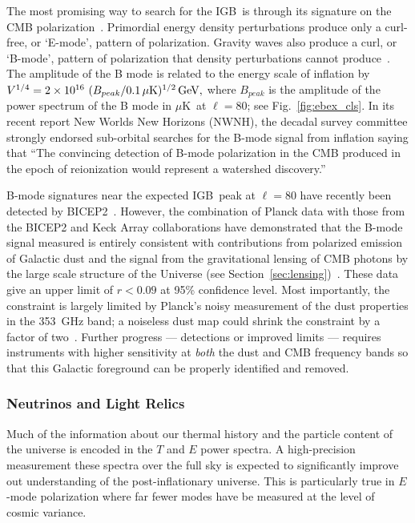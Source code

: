 \documentclass[12pt]{article}
\def\igb{IGB}
\def\microk{$\mu{\mbox{K}}$}
\begin{document}
The most promising way to search for the \igb\ is through its signature on the CMB polarization~\cite{kamionkowski97b,seljak97}.  
Primordial energy density perturbations produce only a curl-free, or `E-mode', pattern of polarization.
Gravity waves also produce a curl, or `B-mode', pattern of polarization that density perturbations cannot
produce~\cite{kamionkowski97a,zaldarriaga97}.  The amplitude of the B mode is related to the energy scale
of inflation by $V^{1/4}=2\times10^{16} \ ( B_{peak} / 0.1\,\mu{\rm
K})^{1/2} \,{\rm GeV},$ where $B_{peak}$ is the amplitude of the power spectrum of the B mode in \microk\ at $\ell=80$;
see Fig.~\ref{fig:ebex_cls}. In its recent report New Worlds New Horizons (NWNH), the decadal survey 
committee strongly endorsed sub-orbital searches for the B-mode signal from 
inflation saying that ``The convincing detection of B-mode polarization in the CMB produced in the 
epoch of reionization would represent a watershed discovery.''~\cite{blandford2010}

B-mode signatures near the expected \igb\ peak at $\ell=80$ have recently been detected by BICEP2~\cite{bicep2Bmode}. 
However, the combination of Planck data with those from the BICEP2 and Keck Array collaborations have demonstrated 
that the B-mode signal measured is entirely consistent with contributions from polarized emission of Galactic dust and the 
signal from the gravitational lensing of CMB photons by the large scale structure of the Universe (see 
Section~\ref{sec:lensing})~\cite{bkp2015,planck2014-XXX,2016PhRvL.116c1302B}. 
These data give an upper limit of $r<0.09$ at 95\% confidence level.
Most importantly, the constraint is largely limited by Planck's noisy measurement of the dust properties in the 353~GHz band; 
a noiseless dust map could shrink the constraint by a factor of two~\cite{bkp2015}. 
Further progress --- detections or improved limits --- requires instruments 
with higher sensitivity at {\it both} the dust and CMB frequency bands so that this Galactic foreground can be properly identified 
and removed. 

\vspace{-0.22in}

\subsubsection{Neutrinos and Light Relics}

\vspace{-0.05in}

Much of the information about our thermal history and the particle content of the universe is encoded in the $T$ and $E$ power spectra.  A high-precision measurement these spectra over the full sky is expected to significantly improve out understanding of the post-inflationary universe.  This is particularly true in $E$-mode polarization where far fewer modes have be measured at the level of cosmic variance.   
\end{document}
